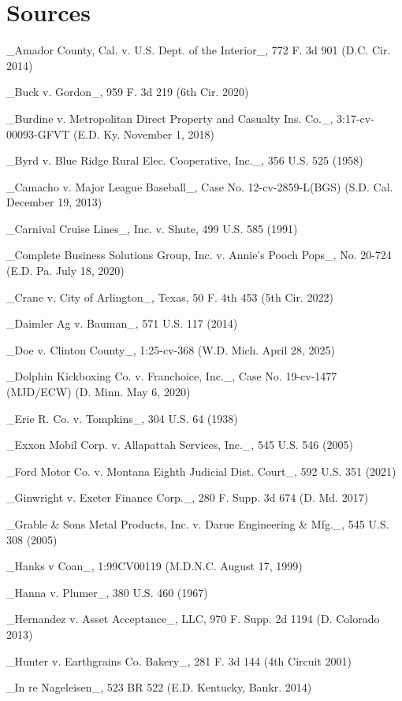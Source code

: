 \backmatter

\chapter*{Sources}


_Amador County, Cal. v. U.S. Dept. of the Interior_, 772 F. 3d 901 (D.C. Cir. 2014)

_Buck v. Gordon_, 959 F. 3d 219 (6th Cir. 2020)

_Burdine v. Metropolitan Direct Property and Casualty Ins. Co._, 3:17-cv-00093-GFVT (E.D. Ky. November 1, 2018)

_Byrd v. Blue Ridge Rural Elec. Cooperative, Inc._, 356 U.S. 525 (1958)

_Camacho v. Major League Baseball_, Case No. 12-cv-2859-L(BGS) (S.D. Cal. December 19, 2013)

_Carnival Cruise Lines_, Inc. v. Shute, 499 U.S. 585 (1991)

_Complete Business Solutions Group, Inc. v. Annie’s Pooch Pops_, No. 20-724 (E.D. Pa. July 18, 2020)

_Crane v. City of Arlington_, Texas, 50 F. 4th 453 (5th Cir. 2022)

_Daimler Ag v. Bauman_, 571 U.S. 117 (2014)

_Doe v. Clinton County_, 1:25-cv-368 (W.D. Mich. April 28, 2025)

_Dolphin Kickboxing Co. v. Franchoice, Inc._, Case No. 19-cv-1477 (MJD/ECW) (D. Minn. May 6, 2020)

_Erie R. Co. v. Tompkins_, 304 U.S. 64 (1938)

_Exxon Mobil Corp. v. Allapattah Services, Inc._, 545 U.S. 546 (2005)

_Ford Motor Co. v. Montana Eighth Judicial Dist. Court_, 592 U.S. 351 (2021)

_Ginwright v. Exeter Finance Corp._, 280 F. Supp. 3d 674 (D. Md. 2017)

_Grable & Sons Metal Products, Inc. v. Darue Engineering & Mfg._, 545 U.S. 308 (2005)

_Hanks v Coan_, 1:99CV00119 (M.D.N.C. August 17, 1999)

_Hanna v. Plumer_, 380 U.S. 460 (1967)

_Hernandez v. Asset Acceptance_, LLC, 970 F. Supp. 2d 1194 (D. Colorado 2013)

_Hunter v. Earthgrains Co. Bakery_, 281 F. 3d 144 (4th Circuit 2001)

_In re Nageleisen_, 523 BR 522 (E.D. Kentucky, Bankr. 2014)

